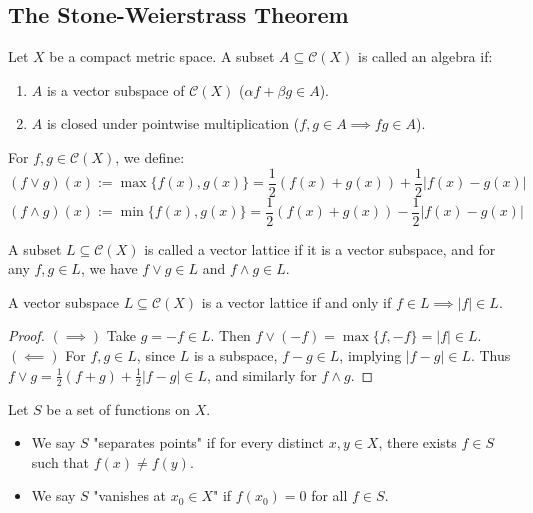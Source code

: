 \subsection{The Stone-Weierstrass Theorem}

\begin{definition}
Let $X$ be a compact metric space. A subset $A \subseteq \mathcal{C}(X)$ is called an algebra if:
\begin{enumerate}
    \item $A$ is a vector subspace of $\mathcal{C}(X)$ ($\alpha f + \beta g \in A$).
    \item $A$ is closed under pointwise multiplication ($f, g \in A \implies fg \in A$).
\end{enumerate}
\end{definition}

For $f, g \in \mathcal{C}(X)$, we define:
$$ (f \vee g)(x) := \max\{f(x), g(x)\} = \frac{1}{2}(f(x) + g(x)) + \frac{1}{2}|f(x) - g(x)| $$
$$ (f \wedge g)(x) := \min\{f(x), g(x)\} = \frac{1}{2}(f(x) + g(x)) - \frac{1}{2}|f(x) - g(x)| $$

\begin{definition}
A subset $L \subseteq \mathcal{C}(X)$ is called a vector lattice if it is a vector subspace, and for any $f, g \in L$, we have $f \vee g \in L$ and $f \wedge g \in L$.
\end{definition}

\begin{proposition}
A vector subspace $L \subseteq \mathcal{C}(X)$ is a vector lattice if and only if $f \in L \implies |f| \in L$.
\end{proposition}
\begin{proof}
$(\implies)$ Take $g = -f \in L$. Then $f \vee (-f) = \max\{f, -f\} = |f| \in L$.
$(\impliedby)$ For $f, g \in L$, since $L$ is a subspace, $f-g \in L$, implying $|f-g| \in L$. Thus $f \vee g = \frac{1}{2}(f+g) + \frac{1}{2}|f-g| \in L$, and similarly for $f \wedge g$.
\end{proof}

\begin{definition}
Let $S$ be a set of functions on $X$.
\begin{itemize}
    \item We say $S$ "separates points" if for every distinct $x, y \in X$, there exists $f \in S$ such that $f(x) \ne f(y)$.
    \item We say $S$ "vanishes at $x_0 \in X$" if $f(x_0) = 0$ for all $f \in S$.
\end{itemize}
\end{definition}

